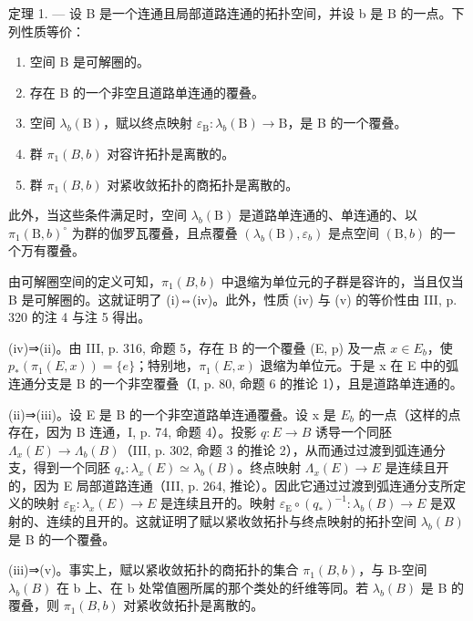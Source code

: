 定理 1. --- 设 B 是一个连通且局部道路连通的拓扑空间，并设 b 是 B 的一点。下列性质等价：

\begin{enumerate}
\def\labelenumi{(\roman{enumi})}
\item
  空间 B 是可解圈的。
\item
  存在 B 的一个非空且道路单连通的覆叠。
\item
  空间 \(\lambda_{b}(\mathrm{B})\)，赋以终点映射 \(\varepsilon_{\mathrm{B}}\colon\lambda_{b}(\mathrm{B})\to\mathrm{B}\)，是 B 的一个覆叠。
\item
  群 \(\pi_1(B, b)\) 对容许拓扑是离散的。
\item
  群 \(\pi_{1}(B,b)\) 对紧收敛拓扑的商拓扑是离散的。
\end{enumerate}

此外，当这些条件满足时，空间 \(\lambda_{b}(\mathrm{B})\) 是道路单连通的、单连通的、以 \(\pi_{1}(\mathrm{B},b)^{\circ}\) 为群的伽罗瓦覆叠，且点覆叠 \((\lambda_{b}(\mathrm{B}),\varepsilon_{b})\) 是点空间 \((\mathrm{B},b)\) 的一个万有覆叠。

由可解圈空间的定义可知，\(\pi_{1}(B,b)\) 中退缩为单位元的子群是容许的，当且仅当 B 是可解圈的。这就证明了 (i)⇔(iv)。此外，性质 (iv) 与 (v) 的等价性由 III, p. 320 的注 4 与注 5 得出。

(iv)⇒(ii)。由 III, p. 316, 命题 5，存在 B 的一个覆叠 (E, p) 及一点 \(x \in E_{b}\)，使 \(p_{*}(\pi_{1}(E, x)) = \{e\}\)；特别地，\(\pi_{1}(E, x)\) 退缩为单位元。于是 x 在 E 中的弧连通分支是 B 的一个非空覆叠（I, p. 80, 命题 6 的推论 1），且是道路单连通的。

(ii)⇒(iii)。设 E 是 B 的一个非空道路单连通覆叠。设 x 是 \(E_{b}\) 的一点（这样的点存在，因为 B 连通，I, p. 74, 命题 4）。投影 \(q: E \to B\) 诱导一个同胚 \(\Lambda_{x}(E) \to \Lambda_{b}(B)\)（III, p. 302, 命题 3 的推论 2），从而通过过渡到弧连通分支，得到一个同胚 \(q_{*}: \lambda_{x}(E) \simeq \lambda_{b}(B)\)。终点映射 \(\Lambda_{x}(E) \to E\) 是连续且开的，因为 E 局部道路连通（III, p. 264, 推论）。因此它通过过渡到弧连通分支所定义的映射 \(\varepsilon_{\mathrm{E}}: \lambda_{x}(E) \to E\) 是连续且开的。映射 \(\varepsilon_{\mathrm{E}} \circ (q_{*})^{-1}: \lambda_{b}(B) \to E\) 是双射的、连续的且开的。这就证明了赋以紧收敛拓扑与终点映射的拓扑空间 \(\lambda_{b}(B)\) 是 B 的一个覆叠。

(iii)⇒(v)。事实上，赋以紧收敛拓扑的商拓扑的集合 \(\pi_{1}(B,b)\)，与 B-空间 \(\lambda_{b}(B)\) 在 b 上、在 b 处常值圈所属的那个类处的纤维等同。若 \(\lambda_{b}(B)\) 是 B 的覆叠，则 \(\pi_{1}(B,b)\) 对紧收敛拓扑是离散的。

